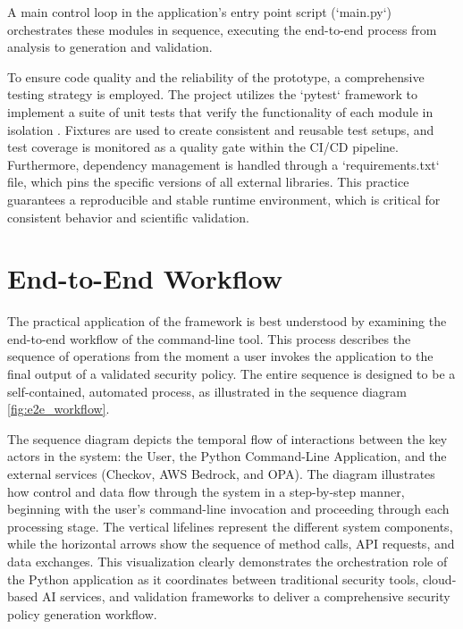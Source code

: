 A main control loop in the application's entry point script (`main.py`) orchestrates these modules in sequence, executing the end-to-end process from analysis to generation and validation.

To ensure code quality and the reliability of the prototype, a comprehensive testing strategy is employed. The project utilizes the `pytest` framework to implement a suite of unit tests that verify the functionality of each module in isolation \cite{okken_python_2017}. Fixtures are used to create consistent and reusable test setups, and test coverage is monitored as a quality gate within the CI/CD pipeline. Furthermore, dependency management is handled through a `requirements.txt` file, which pins the specific versions of all external libraries. This practice guarantees a reproducible and stable runtime environment, which is critical for consistent behavior and scientific validation.


\section{End-to-End Workflow}

The practical application of the framework is best understood by examining the end-to-end workflow of the command-line tool. This process describes the sequence of operations from the moment a user invokes the application to the final output of a validated security policy. The entire sequence is designed to be a self-contained, automated process, as illustrated in the sequence diagram \ref{fig:e2e_workflow}.

The sequence diagram depicts the temporal flow of interactions between the key actors in the system: the User, the Python Command-Line Application, and the external services (Checkov, AWS Bedrock, and OPA). The diagram illustrates how control and data flow through the system in a step-by-step manner, beginning with the user's command-line invocation and proceeding through each processing stage. The vertical lifelines represent the different system components, while the horizontal arrows show the sequence of method calls, API requests, and data exchanges. This visualization clearly demonstrates the orchestration role of the Python application as it coordinates between traditional security tools, cloud-based AI services, and validation frameworks to deliver a comprehensive security policy generation workflow.

